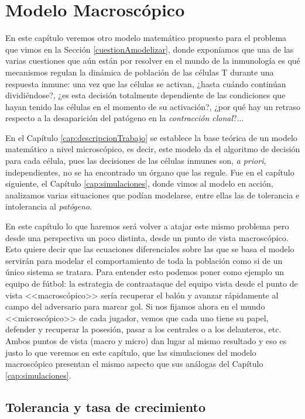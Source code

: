 
\chapter{Modelo Macroscópico}
\label{cap:modeloMacroscopico}

En este capítulo veremos otro modelo matemático propuesto para el problema que vimos en la Sección \ref{cuestionAmodelizar}, donde exponíamos que una de las varias cuestiones que aún están por resolver en el mundo de la inmunología es qué mecanismos regulan la dinámica de población de las células T durante una respuesta inmune: una vez que las células se activan, ¿hasta cuándo continúan dividiéndose?, ¿es esta decisión totalmente dependiente de las condiciones que hayan tenido las células en el momento de su activación?, ¿por qué hay un retraso respecto a la desaparición del patógeno en la \textit{contracción clonal}?... 

En el Capítulo \ref{cap:descripcionTrabajo} se establece la base teórica de un modelo matemático a nivel microscópico, es decir, este modelo da el algoritmo de decisión para cada célula, pues las decisiones de las células inmunes son, \textit{a priori}, independientes, no se ha encontrado un órgano que las regule. Fue en el capítulo siguiente, el Capítulo \ref{cap:simulaciones}, donde vimos al modelo en acción, analizamos varias situaciones que podían modelarse, entre ellas las de tolerancia e intolerancia al \textit{patógeno}.

En este capítulo lo que haremos será volver a atajar este mismo problema pero desde una perspectiva un poco distinta, desde un punto de vista macroscópico. Esto quiere decir que las ecuaciones diferenciales sobre las que se basa el modelo servirán para modelar el comportamiento de toda la población como si de un único sistema se tratara. Para entender esto podemos poner como ejemplo un equipo de fútbol: la estrategia de contraataque del equipo vista desde el punto de vista <<macroscópico>> sería recuperar el balón y avanzar rápidamente al campo del adversario para marcar gol. Si nos fijamos ahora en el mundo <<microscópico>> de cada jugador, vemos que cada uno tiene su papel, defender y recuperar la posesión, pasar a los centrales o a los delanteros, etc. Ambos puntos de vista (macro y micro) dan lugar al mismo resultado y eso es justo lo que veremos en este capítulo, que las simulaciones del modelo macroscópico presentan el mismo aspecto que sus análogas del Capítulo \ref{cap:simulaciones}.

\section{Tolerancia y tasa de crecimiento}

